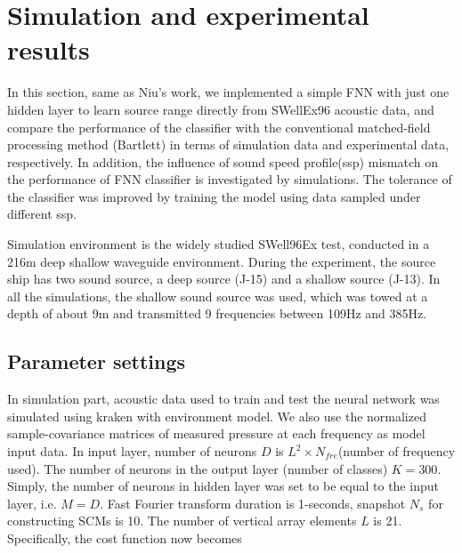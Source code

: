 
\section{Simulation and experimental results}
In this section, same as Niu's work\cite{niu2017source}, we implemented a simple FNN with just one hidden layer to learn source range directly from SWellEx96 acoustic data, and compare the performance of the classifier with the conventional matched-field processing method (Bartlett) in terms of simulation data and experimental data, respectively. In addition, the influence of sound speed profile(ssp) mismatch on the performance of FNN classifier is investigated by simulations. The tolerance of the classifier was improved by training the model using data sampled under different ssp.

Simulation environment is the widely studied SWell96Ex test, conducted in a 216m deep shallow waveguide environment.
During the experiment, the source ship has two sound source, a deep source (J-15) and a shallow source (J-13). In all the simulations, the shallow sound source was used, which was towed at a depth of about 9m and transmitted 9 frequencies between 109Hz and 385Hz.

\subsection{Parameter settings}
In simulation part, acoustic data used to train and test the neural network was simulated using kraken with environment model.  We also use the normalized sample-covariance matrices of measured pressure at each frequency as model input data. In input layer, number of neurons $D$ is $L^{2} \times N_{fre}$(number of frequency used). The number of neurons in the output layer (number of classes) $K = 300$. Simply, the number of neurons in hidden layer was set to be equal to the input layer, i.e. $M = D$. Fast	Fourier	transform duration is 1-seconds, snapshot $N_{s}$ for constructing SCMs is 10. The number of vertical array elements $L$ is 21. Specifically, the cost function now becomes

